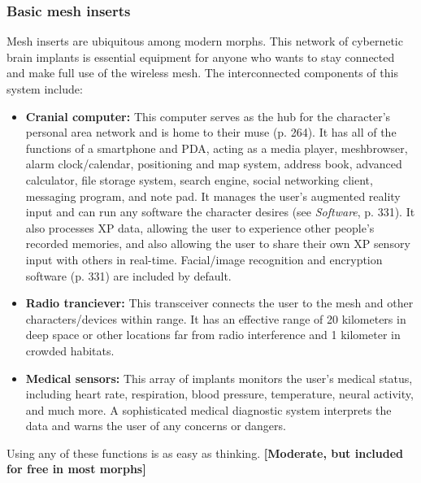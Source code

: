\subsubsection{Basic mesh inserts}

Mesh inserts are ubiquitous among modern morphs. This network of cybernetic brain implants is essential equipment for anyone who wants to stay connected and make full use of the wireless mesh. The interconnected components of this system include:

\begin{itemize}
\item \textbf{Cranial computer:} This computer serves as the hub for the character’s personal area network and is home to their muse (p. 264). It has all of the functions of a smartphone and PDA, acting as a media player, meshbrowser, alarm clock/calendar, positioning and map system, address book, advanced calculator, file storage system, search engine, social networking client, messaging program, and note pad. It manages the user’s augmented reality input and can run any software the character desires (see \emph{Software}, p. 331). It also processes XP data, allowing the user to experience other people’s recorded memories, and also allowing the user to share their own XP sensory input with others in real-time. Facial/image recognition and encryption software (p. 331) are included by default.
\item \textbf{Radio tranciever:} This transceiver connects the user to the mesh and other characters/devices within range. It has an effective range of 20 kilometers in deep space or other locations far from radio interference and 1 kilometer in crowded habitats.
\item \textbf{Medical sensors:} This array of implants monitors the user’s medical status, including heart rate, respiration, blood pressure, temperature, neural activity, and much more. A sophisticated medical diagnostic system interprets the data and warns the user of any concerns or dangers.
\end{itemize}

Using any of these functions is as easy as thinking. \textbf{[Moderate, but included for free in most morphs]}

